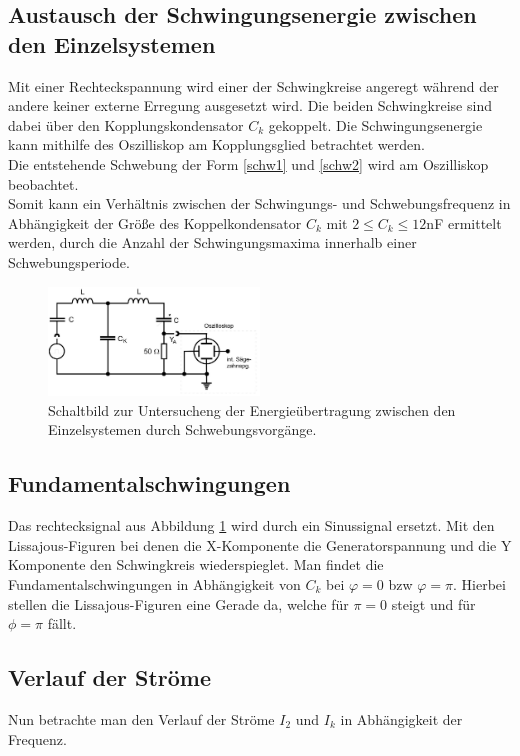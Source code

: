 \subsection{Austausch der Schwingungsenergie zwischen den Einzelsystemen}
Mit einer Rechteckspannung wird einer der Schwingkreise angeregt während der andere
keiner externe Erregung ausgesetzt wird. Die beiden Schwingkreise sind dabei über den
Kopplungskondensator $C_k$ gekoppelt. Die Schwingungsenergie kann mithilfe des
Oszilliskop am Kopplungsglied betrachtet werden.\\
Die entstehende Schwebung der Form \ref{schw1} und \ref{schw2}
wird am Oszilliskop beobachtet.\\
Somit kann ein Verhältnis zwischen der Schwingungs- und Schwebungsfrequenz in 
Abhängigkeit der Größe des Koppelkondensator $C_k$ mit $2\leq C_k \leq 12$nF ermittelt 
werden, durch die Anzahl der Schwingungsmaxima innerhalb einer Schwebungsperiode.
\begin{figure}
    \centering
    \includegraphics[width=0.5\textwidth]{bilder/a.jpg}
    \caption{
        Schaltbild zur Untersucheng der Energieübertragung zwischen den Einzelsystemen
        durch Schwebungsvorgänge. \cite[306]{Anleitung}
    }
    \label{fig:Versuchsaufbau}
\end{figure}
\subsection{Fundamentalschwingungen}
Das rechtecksignal aus Abbildung \ref{fig:Versuchsaufbau} wird durch ein Sinussignal
ersetzt. Mit den Lissajous-Figuren bei denen die X-Komponente die Generatorspannung 
und die Y Komponente den Schwingkreis wiederspieglet.
Man findet die Fundamentalschwingungen in Abhängigkeit von $C_k$ bei $\varphi=0$ bzw $\varphi=\pi$.
Hierbei stellen die Lissajous-Figuren eine Gerade da, welche für $\pi=0$ steigt und
für $\phi=\pi$ fällt.\\

\subsection{Verlauf der Ströme}
Nun betrachte man den Verlauf der Ströme $I_2$ und $I_k$ in Abhängigkeit der Frequenz.






\label{sec:Durchfuehrung}
